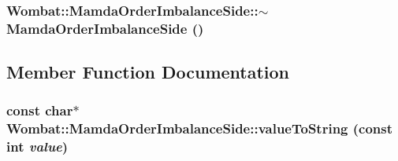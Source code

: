 \hypertarget{classWombat_1_1MamdaOrderImbalanceSide_9576c1da63bf97ca79f3d2ab616d669a}{
\subsubsection[$\sim$MamdaOrderImbalanceSide]{\setlength{\rightskip}{0pt plus 5cm}Wombat::Mamda\-Order\-Imbalance\-Side::$\sim$Mamda\-Order\-Imbalance\-Side ()}}
\label{classWombat_1_1MamdaOrderImbalanceSide_9576c1da63bf97ca79f3d2ab616d669a}




\subsection{Member Function Documentation}
\hypertarget{classWombat_1_1MamdaOrderImbalanceSide_106cdb74bfd59fbbc213d82c4b1181e8}{
\subsubsection[valueToString]{\setlength{\rightskip}{0pt plus 5cm}const char$\ast$ Wombat::Mamda\-Order\-Imbalance\-Side::value\-To\-String (const int {\em value})}}
\label{classWombat_1_1MamdaOrderImbalanceSide_106cdb74bfd59fbbc213d82c4b1181e8}


